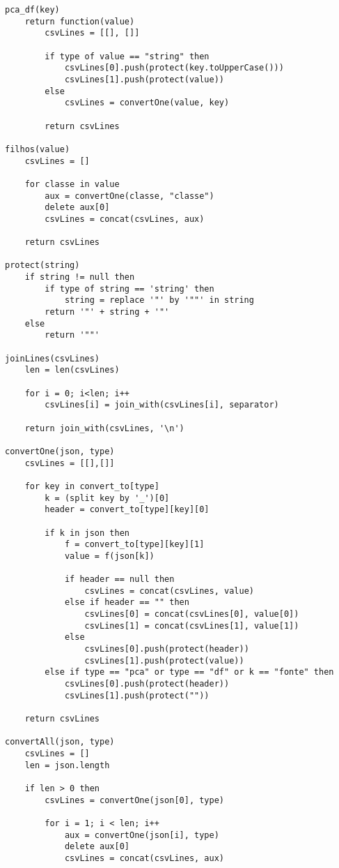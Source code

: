 \begin{lstlisting}[language=pseudocode, caption=Algorítmo de conversão de \acrshort{json} para \acrshort{csv}]
pca_df(key)
    return function(value)
        csvLines = [[], []]

        if type of value == "string" then
            csvLines[0].push(protect(key.toUpperCase()))
            csvLines[1].push(protect(value))
        else
            csvLines = convertOne(value, key)

        return csvLines

filhos(value)
    csvLines = []

    for classe in value
        aux = convertOne(classe, "classe")
        delete aux[0]
        csvLines = concat(csvLines, aux)

    return csvLines

protect(string)
    if string != null then
        if type of string == 'string' then
            string = replace '"' by '""' in string
        return '"' + string + '"'
    else
        return '""'

joinLines(csvLines)
    len = len(csvLines)

    for i = 0; i<len; i++
        csvLines[i] = join_with(csvLines[i], separator)

    return join_with(csvLines, '\n')

convertOne(json, type)
    csvLines = [[],[]]

    for key in convert_to[type]
        k = (split key by '_')[0]
        header = convert_to[type][key][0]

        if k in json then
            f = convert_to[type][key][1]
            value = f(json[k])

            if header == null then
                csvLines = concat(csvLines, value)
            else if header == "" then
                csvLines[0] = concat(csvLines[0], value[0])
                csvLines[1] = concat(csvLines[1], value[1])
            else
                csvLines[0].push(protect(header))
                csvLines[1].push(protect(value))
        else if type == "pca" or type == "df" or k == "fonte" then
            csvLines[0].push(protect(header))
            csvLines[1].push(protect(""))

    return csvLines

convertAll(json, type)
    csvLines = []
    len = json.length

    if len > 0 then
        csvLines = convertOne(json[0], type)

        for i = 1; i < len; i++
            aux = convertOne(json[i], type)
            delete aux[0]
            csvLines = concat(csvLines, aux)


\end{lstlisting}

